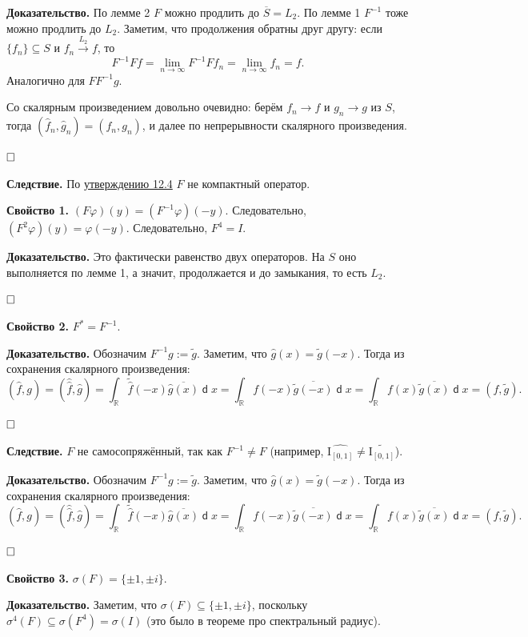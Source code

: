 \documentclass[12pt, a4paper]{article}
\DeclareMathOperator{\dif}{\mathsf{d}}
\newcommand{\QED}{$\hfill\square$}
\renewcommand{\phi}{\varphi}   %
\renewcommand{\subset}{\subseteq}   %
\begin{document}
\textbf{Доказательство.} По лемме 2 $F$ можно продлить до $\overline S = L_2$. По лемме 1 $F^{-1}$ тоже можно продлить до $L_2$. Заметим, что продолжения обратны друг другу: если $\{f_n\} \subset S$ и $f_n \overset{L_2}{\to} f$, то
\[
    F^{-1}Ff = \lim_{n \to \infty} F^{-1}Ff_n = \lim_{n \to \infty} f_n = f.
\]
Аналогично для $FF^{-1}g$.

Со скалярным произведением довольно очевидно: берём $f_n \to f$ и $g_n \to g$ из $S$, тогда $(\hat f_n, \hat g_n) = (f_n, g_n)$, и далее по непрерывности скалярного произведения.

\QED

\textbf{Следствие.} По \hyperref[st:12.4]{утверждению 12.4} $F$ не компактный оператор.

\textbf{Свойство 1.} $(F \phi)(y) = (F^{-1}\phi)(-y)$. Следовательно, $(F^2 \phi)(y) = \phi(-y)$. Следовательно, $F^4 = I$.

\textbf{Доказательство.} Это фактически равенство двух операторов. На $S$ оно выполняется по лемме 1, а значит, продолжается и до замыкания, то есть $L_2$.

\QED

\textbf{Свойство 2.} $F^* = F^{-1}$.

\textbf{Доказательство.} Обозначим $F^{-1}g := \tilde g$. Заметим, что $\hat g(x) = \tilde g(-x)$. Тогда из сохранения скалярного произведения:
\[
    (\hat f, g) = (\hat{\hat{f}}, \hat g) = \int_{\mathbb R} \tilde{\hat{f}}(-x) \overline{\hat g(x)} \dif x = \int_{\mathbb R} f(-x) \overline{\tilde g(-x)} \dif x = \int_{\mathbb R} f(x) \overline{\tilde g(x)} \dif x = (f, \tilde g).
\]

\QED

\textbf{Следствие.} $F$ не самосопряжённый, так как $F^{-1} \neq F$ (например, $\widehat{\mathrm I_{[0, 1]}} \neq \widetilde{\mathrm I_{[0, 1]}}$).

\textbf{Доказательство.} Обозначим $F^{-1}g := \tilde g$. Заметим, что $\hat g(x) = \tilde g(-x)$. Тогда из сохранения скалярного произведения:
\[
    (\hat f, g) = (\hat{\hat{f}}, \hat g) = \int_{\mathbb R} \tilde{\hat{f}}(-x) \overline{\hat g(x)} \dif x = \int_{\mathbb R} f(-x) \overline{\tilde g(-x)} \dif x = \int_{\mathbb R} f(x) \overline{\tilde g(x)} \dif x = (f, \tilde g).
\]

\QED

\textbf{Свойство 3.} $\sigma(F) = \{\pm 1, \pm i\}$.

\textbf{Доказательство.} 
Заметим, что $\sigma(F) \subset \{\pm 1, \pm i\}$, поскольку $\sigma^4(F) \subset \sigma(F^4) = \sigma(I)$ (это было в теореме про спектральный радиус).
\end{document}

